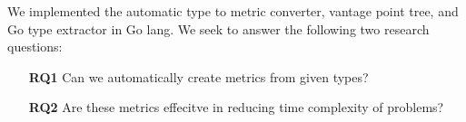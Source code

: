 We implemented the automatic type to metric converter,
vantage point tree,
and Go type extractor in Go lang.
We seek to answer the following two research questions:
\begin{itemize}
    \item[\textbf{RQ1}] Can we automatically create metrics from given types?
    \item[\textbf{RQ2}] Are these metrics effecitve in reducing time complexity of problems?
\end{itemize}